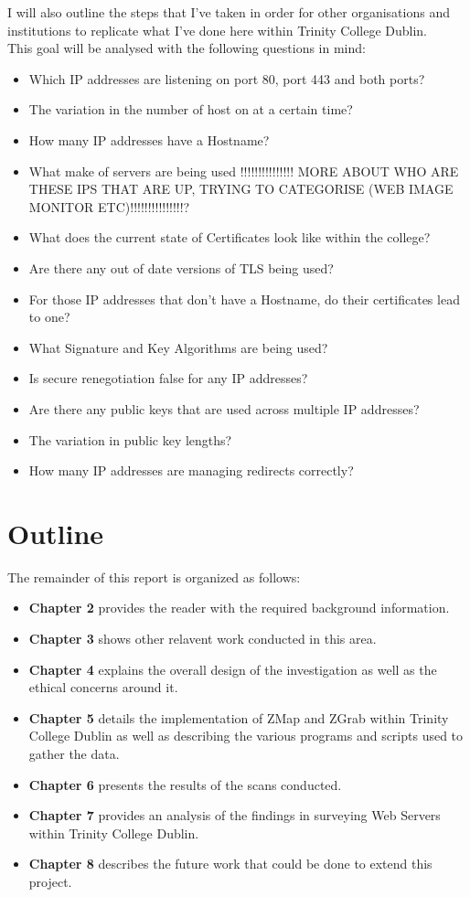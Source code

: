 \documentclass[a4wide,leqno,12pt]{report}
\begin{document}
I will also outline the steps that I've taken in order for other organisations and institutions to replicate what I've done here within Trinity College Dublin.\\


This goal will be analysed with the following questions in mind:
\begin{itemize}
  \item Which IP addresses are listening on port 80, port 443 and both ports?
  \item The variation in the number of host on at a certain time?
  \item How many IP addresses have a Hostname?
  \item What make of servers are being used !!!!!!!!!!!!!!! MORE ABOUT WHO ARE THESE IPS THAT ARE UP, TRYING TO CATEGORISE (WEB IMAGE MONITOR ETC)!!!!!!!!!!!!!!!?
  \item What does the current state of Certificates look like within the college?
  \item Are there any out of date versions of TLS being used?
  \item For those IP addresses that don't have a Hostname, do their certificates lead to one?
  \item What Signature and Key Algorithms are being used?
  \item Is secure renegotiation false for any IP addresses?
  \item Are there any public keys that are used across multiple IP addresses?
  \item The variation in public key lengths?
  \item How many IP addresses are managing redirects correctly?
  
\end{itemize}
\section{Outline} 
The remainder of this report is organized as follows:\\
\begin{itemize}
\item\textbf{Chapter 2} provides the reader with the required background information.
\item\textbf{Chapter 3} shows other relavent work conducted in this area.
\item\textbf{Chapter 4} explains the overall design of the investigation as well as the ethical concerns around it.
\item\textbf{Chapter 5} details the implementation of ZMap and ZGrab within Trinity College Dublin as well as describing the various programs and scripts used to gather the data.
\item\textbf{Chapter 6} presents the results of the scans conducted.
\item\textbf{Chapter 7} provides an analysis of the findings in surveying Web Servers within Trinity College Dublin.
\item\textbf{Chapter 8} describes the future work that could be done to extend this project.
\end{itemize}
\end{document}
